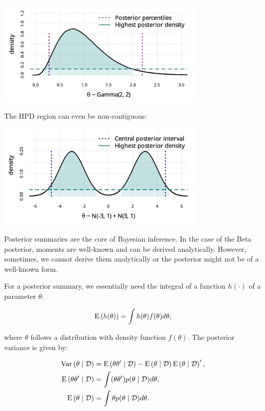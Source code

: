 \begin{center}
	\includegraphics[width = 10cm]{posteriorregion1.png}
\end{center}

The HPD region can even be non-contiguous:

\begin{center}
	\includegraphics[width = 10cm]{posteriorregion2.png}
\end{center}

Posterior summaries are the core of Bayesian inference. In the case of the Beta posterior, moments are well-known and can be derived analytically. However, sometimes, we cannot derive them analytically or the posterior might not be of a well-known form. 

For a posterior summary, we essentially need the integral of a function $h(\cdot)$ of a parameter $\theta$:

\[
	\mathrm{E}\left({h(\theta)}\right) = \int h(\theta)f(\theta)d\theta,
\]

where $\theta$ follows a distribution with density function $f(\theta)$. The posterior variance is given by:

\begin{align*}
	\mathrm{Var}\left({\theta\mid\mathcal{D}}\right) &= \mathrm{E}\left({\theta\theta'\mid\mathcal{D}}\right)-\mathrm{E}\left({\theta\mid\mathcal{D}}\right)\mathrm{E}\left({\theta\mid\mathcal{D}}\right)', \\
	\mathrm{E}\left({\theta\theta'\mid\mathcal{D}}\right) &= \int (\theta\theta')p(\theta\mid\mathcal{D})d\theta, \\
	\mathrm{E}\left({\theta\mid\mathcal{D}}\right) &= \int \theta p(\theta\mid\mathcal{D})d\theta.
\end{align*}


